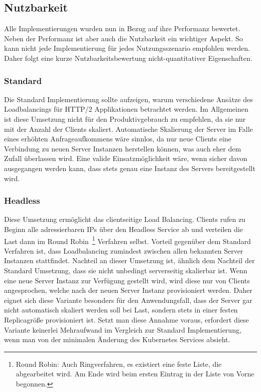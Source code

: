 \subsection{Nutzbarkeit}\label{subsec:nutzbarkeit}

Alle Implementierungen wurden nun in Bezug auf ihre Performanz bewertet.
Neben der Performanz ist aber auch die Nutzbarkeit ein wichtiger Aspekt.
So kann nicht jede Implementierung für jedes Nutzungsszenario empfohlen werden.
Daher folgt eine kurze Nutzbarkeitsbewertung nicht-quantitativer Eigenschaften.

\subsubsection{Standard}
Die Standard Implementierung sollte aufzeigen, warum verschiedene Ansätze des Loadbalancings für HTTP/2 Applikationen betrachtet werden.
Im Allgemeinen ist diese Umsetzung nicht für den Produktivgebrauch zu empfehlen, da sie nur mit der Anzahl der Clients skaliert.
Automatische Skalierung der Server im Falle eines erhöhten Anfrageaufkommens wäre sinnlos, da nur neue Clients eine Verbindung zu neuen Server Instanzen herstellen können, was auch eher dem Zufall überlassen wird.
Eine valide Einsatzmöglichkeit wäre, wenn sicher davon ausgegangen werden kann, dass stets genau eine Instanz des Servers bereitgestellt wird.

\subsubsection{Headless}
Diese Umsetzung ermöglicht das clientseitige Load Balancing.
Clients rufen zu Beginn alle adressierbaren IPs über den Headless Service ab und verteilen die Last dann im Round Robin~\footnote{Round Robin: Auch Ringverfahren, es existiert eine feste Liste, die abgearbeitet wird. Am Ende wird beim ersten Eintrag in der Liste von Vorne begonnen.} Verfahren selbst.
Vorteil gegenüber dem Standard Verfahren ist, dass Loadbalancing zumindest zwischen allen bekannten Server Instanzen stattfindet.
Nachteil an dieser Umsetzung ist, ähnlich dem Nachteil der Standard Umsetzung, dass sie nicht unbedingt serverseitig skalierbar ist.
Wenn eine neue Server Instanz zur Verfügung gestellt wird, wird diese nur von Clients angesprochen, welche nach der neuen Server Instanz provisioniert werden.
Daher eignet sich diese Variante besonders für den Anwendungsfall, dass der Server gar nicht automatisch skaliert werden soll bei Last, sondern stets in einer festen Replicagröße provisioniert ist.
Setzt man diese Annahme voraus, erfordert diese Variante keinerlei Mehraufwand im Vergleich zur Standard Implementierung, wenn man von der minimalen Änderung des Kubernetes Services absieht.

